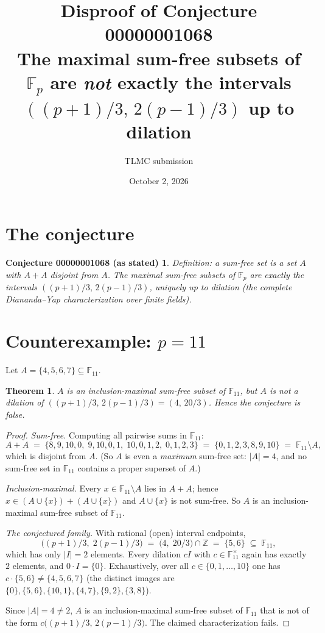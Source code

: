 \documentclass[11pt]{article}
\title{Disproof of Conjecture 00000001068\\
\large The maximal sum-free subsets of $\mathbb{F}_p$ are \emph{not} exactly the intervals $((p+1)/3,\,2(p-1)/3)$ up to dilation}
\author{TLMC submission}
\date{October 2, 2026}
\newcommand{\F}{\mathbb{F}}
\newtheorem*{claim}{Conjecture 00000001068 (as stated)}
\newtheorem*{thm}{Theorem}
\begin{document}
\maketitle

\section{The conjecture}

\begin{claim}
Definition: a sum-free set is a set $A$ with $A + A$ disjoint from $A$. The maximal sum-free subsets of $\F_p$ are exactly the intervals $((p+1)/3,\, 2(p-1)/3)$, uniquely up to dilation (the complete Diananda--Yap characterization over finite fields).
\end{claim}

\section{Counterexample: $p = 11$}

Let $A = \{4,5,6,7\} \subseteq \F_{11}$.

\begin{thm}
$A$ is an inclusion-maximal sum-free subset of $\F_{11}$, but $A$ is not a dilation of $((p+1)/3,\,2(p-1)/3) = (4,\,20/3)$. Hence the conjecture is false.
\end{thm}

\begin{proof}
\emph{Sum-free.} Computing all pairwise sums in $\F_{11}$:
\[
A + A \;=\; \{8,9,10,0,\; 9,10,0,1,\; 10,0,1,2,\; 0,1,2,3\} \;=\; \{0,1,2,3,8,9,10\} \;=\; \F_{11}\setminus A,
\]
which is disjoint from $A$. (So $A$ is even a \emph{maximum} sum-free set: $|A| = 4$, and no sum-free set in $\F_{11}$ contains a proper superset of $A$.)

\emph{Inclusion-maximal.} Every $x \in \F_{11}\setminus A$ lies in $A+A$; hence $x \in (A\cup\{x\}) + (A\cup\{x\})$ and $A\cup\{x\}$ is not sum-free. So $A$ is an inclusion-maximal sum-free subset of $\F_{11}$.

\emph{The conjectured family.} With rational (open) interval endpoints,
\[
\bigl((p+1)/3,\; 2(p-1)/3\bigr) \;=\; \bigl(4,\; 20/3\bigr) \cap \mathbb{Z} \;=\; \{5,6\} \;\subseteq\; \F_{11},
\]
which has only $|I| = 2$ elements. Every dilation $cI$ with $c \in \F_{11}^{\times}$ again has exactly $2$ elements, and $0\cdot I = \{0\}$. Exhaustively, over all $c \in \{0,1,\dots,10\}$ one has $c \cdot \{5,6\} \neq \{4,5,6,7\}$ (the distinct images are $\{0\},\{5,6\},\{10,1\},\{4,7\},\{9,2\},\{3,8\}$).

Since $|A| = 4 \neq 2$, $A$ is an inclusion-maximal sum-free subset of $\F_{11}$ that is not of the form $c\bigl((p+1)/3,\,2(p-1)/3\bigr)$. The claimed characterization fails.
\end{proof}
\end{document}
